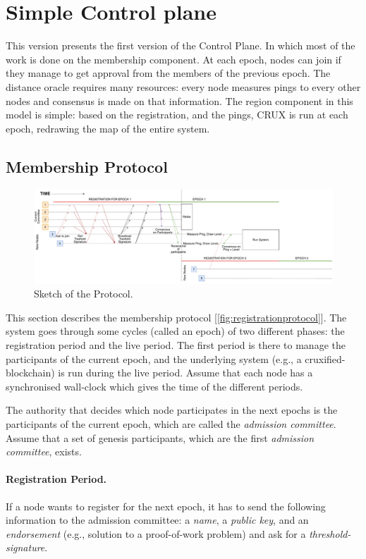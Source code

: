 \documentclass[a4paper,11pt,twoside=semi,openright]{report}
\begin{document}
\section{Simple Control plane} This version presents the first version of the
Control Plane. In which most of the work is done on the membership component.
At each epoch, nodes can join if they manage to get approval from the members
of the previous epoch. The distance oracle requires many resources: every
node measures pings to every other nodes and consensus is made on that
information. The region component in this model is simple: based on the
registration, and the pings, CRUX is run at each epoch, redrawing the map of
the entire system. 

\subsection{Membership Protocol}

\begin{figure}
\centering
\includegraphics[width=700pt]{figures/Registrationprotocol}
\caption{Sketch of the Protocol.}
\label{fig:registrationprotocol}
\end{figure}

This section describes the membership protocol
[\autoref{fig:registrationprotocol}].  The system goes through some cycles
(called an epoch) of two different phases: the registration period and the live
period. The first period is there to manage the participants of the current
epoch, and the underlying system (e.g., a cruxified-blockchain) is run during
the live period. Assume that each node has a synchronised wall-clock which
gives the time of the different periods.

The authority that decides which node participates in the next epochs is
the participants of the current epoch, which are called the \textit{admission
committee}. Assume that a set of genesis participants, which are the first
 \textit{admission committee}, exists.

\paragraph{Registration Period.}
If a node wants to register for the next epoch, it has to send the following
information to the admission committee: a \textit{name}, a \textit{public key},
and an \textit{endorsement} (e.g., solution to a proof-of-work problem) and ask
for a \textit{threshold-signature}. 
\end{document}
